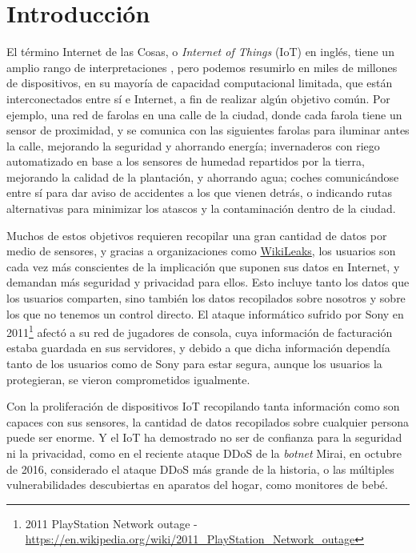 \chapter*{Introducción}\label{ch:introduccion}

El término Internet de las Cosas, o \textit{Internet of Things} (IoT) en inglés, tiene un amplio rango de interpretaciones \citep{Atzori20102787}, pero podemos resumirlo en miles de millones de dispositivos, en su mayoría de capacidad computacional limitada, que están interconectados entre sí e Internet, a fin de realizar algún objetivo común. Por ejemplo, una red de farolas en una calle de la ciudad, donde cada farola tiene un sensor de proximidad, y se comunica con las siguientes farolas para iluminar antes la calle, mejorando la seguridad y ahorrando energía; invernaderos con riego automatizado en base a los sensores de humedad repartidos por la tierra, mejorando la calidad de la plantación, y ahorrando agua; coches comunicándose entre sí para dar aviso de accidentes a los que vienen detrás, o indicando rutas alternativas para minimizar los atascos y la contaminación dentro de la ciudad. 


Muchos de estos objetivos requieren recopilar una gran cantidad de datos por medio de sensores, y gracias a organizaciones como \href{https://wikileaks.org/}{WikiLeaks}, los usuarios son cada vez más conscientes de la implicación que suponen sus datos en Internet, y demandan más seguridad y privacidad para ellos. Esto incluye tanto los datos que los usuarios comparten, sino también los datos recopilados sobre nosotros y sobre los que no tenemos un control directo. El ataque informático sufrido por Sony en 2011\footnote{2011 PlayStation Network outage - 
\url{https://en.wikipedia.org/wiki/2011_PlayStation_Network_outage}} afectó a su red de jugadores de consola, cuya información de facturación estaba guardada en sus servidores, y debido a que dicha información dependía tanto de los usuarios como de Sony para estar segura, aunque los usuarios la protegieran, se vieron comprometidos igualmente.


Con la proliferación de dispositivos IoT recopilando tanta información como son capaces con sus sensores, la cantidad de datos recopilados sobre cualquier persona puede ser enorme. Y el IoT ha demostrado no ser de confianza para la seguridad ni la privacidad, como en el reciente ataque DDoS de la \textit{botnet} Mirai, en octubre de 2016, considerado el ataque DDoS más grande de la historia\citep{jeyanthi:2017}, o las múltiples vulnerabilidades descubiertas en aparatos del hogar, como monitores de bebé\citep{rapid7babycam}.


